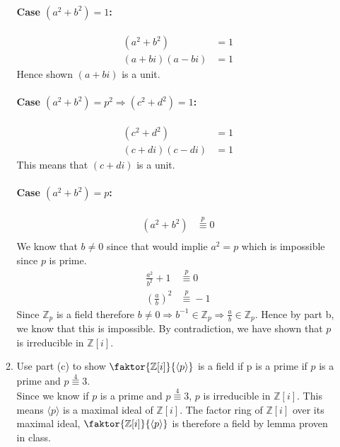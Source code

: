 \documentclass[12pt]{article}
\begin{document}
\begin{enumerate}
\begin{enumerate}
				\paragraph{Case $(a^2 + b^2)=1$:}
				\begin{align*}
					(a^2 + b^2)&=1\\
					(a+bi)(a-bi) &= 1
				\end{align*}
				Hence shown $(a+bi)$ is a unit.
				\paragraph{Case $(a^2 + b^2)=p^2 \Rightarrow (c^2 + d^2)=1$:}
				\begin{align*}
					(c^2 + d^2)&=1\\
					(c+di)(c-di) &= 1
				\end{align*}
				This means that $(c+di)$ is a unit.
				\paragraph{Case $(a^2 + b^2)=p$:}
				\begin{align*}
					(a^2 + b^2) &\overset{p}{\equiv}0\\
				\end{align*}
				We know that $b\neq0$ since that would implie $a^2=p$ which is
				impossible since $p$ is prime.
				\begin{align*}
					\frac{a^2}{b^2} +1 &\overset{p}{\equiv}0\\
					\left(\frac{a}{b}\right)^2 &\overset{p}{\equiv} -1
				\end{align*}
				Since  $\mathbb{Z}_p$ is a field therefore $b \neq 0 \Rightarrow b^{-1}
				\in \mathbb{Z}_p \Rightarrow \frac{a}{b} \in \mathbb{Z}_p$. Hence by
				part b, we know that this is impossible. By contradiction, we have shown
				that $p$ is irreducible in $\mathbb{Z}[i]$.

			\item Use part (c) to show $\faktor{\mathbb{Z}[i]}{\langle p \rangle}$
				is a field if p is a prime if $p$ is a prime and $p \overset{4}{\equiv}
				3$.\\
				Since we know if $p$ is a prime and $p \overset{4}{\equiv} 3$, $p$ is
				irreducible in $\mathbb{Z}[i]$. This means $\langle p \rangle$ is a
				maximal ideal of $\mathbb{Z}[i]$. The factor ring of $\mathbb{Z}[i]$
				over its maximal ideal, $\faktor{\mathbb{Z}[i]}{\langle p \rangle}$ is
				therefore a field by lemma proven in class.
		\end{enumerate}
\end{enumerate}
\end{document}
